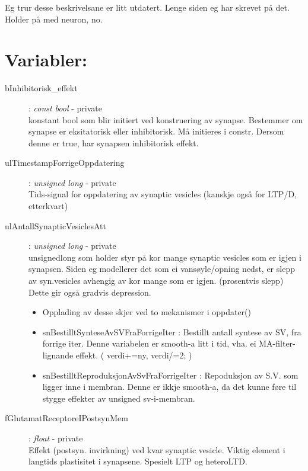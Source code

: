 	Eg trur desse beskrivelsane er litt utdatert. Lenge siden eg har skrevet på det. Holder på med neuron, no.


	\section{Variabler:}
		\begin{description}
			\item[bInhibitorisk\_effekt] 	 		: 	\textit{const bool} 	- 	private \\
		konstant bool som blir initiert ved konstruering av synapse. Bestemmer om synapse er eksitatorisk eller inhibitorisk. Må initieres i constr.
		Dersom denne er true, har synapsen inhibitorisk effekt.
		\item[ulTimestampForrigeOppdatering] 		: 	\textit{unsigned long}  - 	private \\
		Tids-signal for oppdatering av synaptic vesicles (kanskje også for LTP/D, etterkvart)
		
		\item[ulAntallSynapticVesiclesAtt] 			: 	\textit{unsigned long} 	- 	private \\
	        unsignedlong som holder styr på kor mange synaptic vesicles som er igjen i synapsen. Siden eg modellerer det som ei vansøyle/opning nedst,
		er slepp av syn.vesicles avhengig av kor mange som er igjen. (prosentvis slepp) Dette gir også gradvis depression.
 			\begin{itemize}
				\item Opplading av desse skjer ved to mekanismer i oppdater()
				\item snBestilltSynteseAvSVFraForrigeIter : Bestillt antall syntese av SV, fra forrige iter. Denne variabelen er smooth-a litt
				    i tid, vha. ei MA-filter-lignande effekt. ( verdi+=ny, verdi/=2; )
			 	\item snBestilltReproduksjonAvSvFraForrigeIter : Repoduksjon av S.V. som ligger inne i membran. Denne er ikkje smooth-a, da det 
			       	    kunne føre til stygge effekter av unsigned sv-i-membran.
			\end{itemize}    

		\item[fGlutamatReceptoreIPostsynMem] 		: 	\textit{float} 		- 	private \\
		Effekt (postsyn. invirkning) ved kvar synaptic vesicle. Viktig element i langtids plastisitet i synapsene. Spesielt LTP og heteroLTD.



\end{description}
